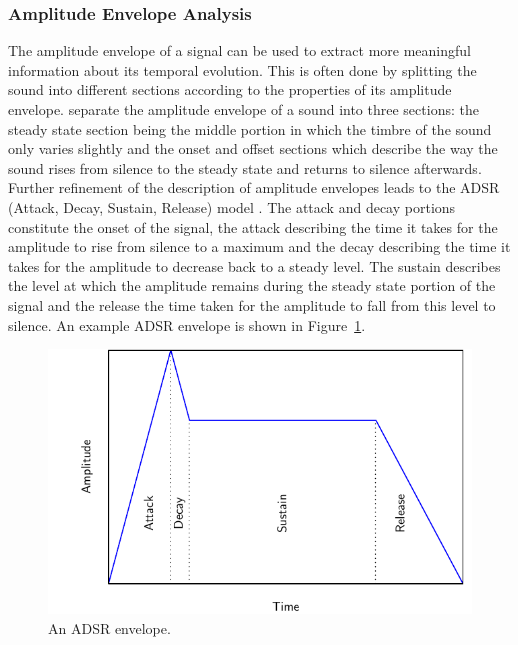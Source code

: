 		\subsubsection*{Amplitude Envelope Analysis}
			The amplitude envelope of a signal can be used to extract more meaningful information about its
			temporal evolution. This is often done by splitting the sound into different sections according to
			the properties of its amplitude envelope. \citet{howard2009acoustics} separate the amplitude
			envelope of a sound into three sections: the steady state section being the middle portion in which
			the timbre of the sound only varies slightly and the onset and offset sections which describe the
			way the sound rises from silence to the steady state and returns to silence afterwards. Further
			refinement of the description of amplitude envelopes leads to the ADSR (Attack, Decay, Sustain,
			Release) model \citep{descrivan2012music}. The attack and decay portions constitute the onset of
			the signal, the attack describing the time it takes for the amplitude to rise from silence to a
			maximum and the decay describing the time it takes for the amplitude to decrease back to a steady
			level. The sustain describes the level at which the amplitude remains during the steady state
			portion of the signal and the release the time taken for the amplitude to fall from this level to
			silence. An example ADSR envelope is shown in Figure~\ref{fig:ADSR}.

			\begin{figure}[h!]
				\centering
				\includegraphics{chapter2/Images/ADSR.pdf}
				\caption{An ADSR envelope.}
				\label{fig:ADSR}
			\end{figure}

